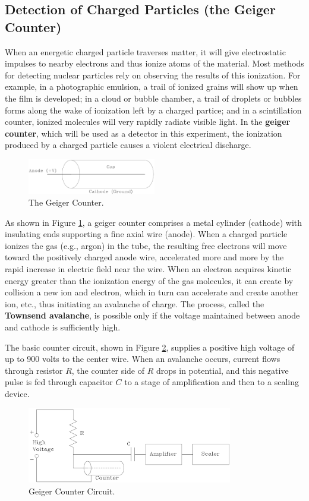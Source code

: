 \subsection{Detection of Charged Particles (the Geiger Counter)}
When an energetic charged particle traverses matter, it will give electrostatic impulses to nearby electrons and thus ionize atoms of the material. Most methods for detecting nuclear particles rely on observing the results of this ionization. For example, in a photographic emulsion, a trail of ionized grains will show up when the film is developed; in a cloud or bubble chamber, a trail of droplets or bubbles forms along the wake of ionization left by a charged partice; and in a scintillation counter, ionized molecules will very rapidly radiate visible light. In the \textbf{geiger counter}, which will be used as a detector in this experiment, the ionization produced by a charged particle causes a violent electrical discharge.
\begin{figure}[h]
\centering
\includegraphics[width=0.5\textwidth]{./Exp10/pic/image3.png}
\caption{The Geiger Counter.}
\label{fig:counter}
\end{figure}

As shown in Figure {\ref{fig:counter}}, a geiger counter comprises a metal cylinder (cathode) with insulating ends supporting a fine axial wire (anode). When a charged particle ionizes the gas (e.g., argon) in the tube, the resulting free electrons will move toward the positively charged anode wire, accelerated more and more by the rapid increase in electric field near the wire. When an electron acquires kinetic energy greater than the ionization energy of the gas molecules, it can create by collision a new ion and electron, which in turn can accelerate and create another ion, etc., thus initiating an avalanche of charge. The process, called the \textbf{Townsend avalanche}, is possible only if the voltage maintained between anode and cathode is sufficiently high.\myskip

The basic counter circuit, shown in Figure {\ref{fig:geiger}}, supplies a positive high voltage of up to 900 volts to the center wire. When an avalanche occurs, current flows through resistor $R$, the counter side of $R$ drops in potential, and this negative pulse is fed through capacitor $C$ to a stage of amplification and then to a scaling device.\myskip
\begin{figure}[h]
\centering
\includegraphics[width=0.8\textwidth]{./Exp10/pic/image4.png}
\caption{Geiger Counter Circuit.}
\label{fig:geiger}
\end{figure}

